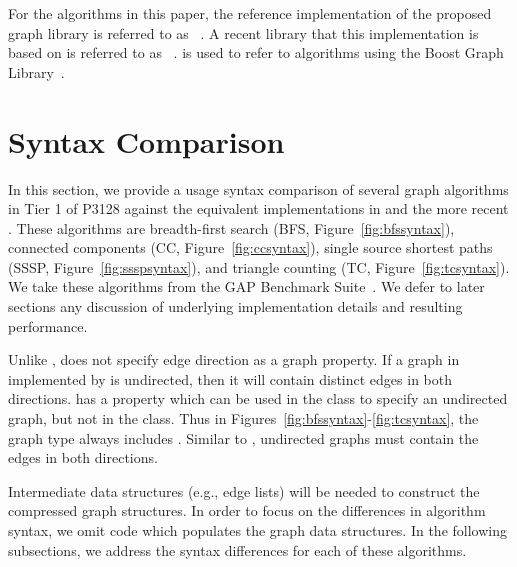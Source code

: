 \clearpage

For the algorithms in this paper, the reference implementation of the proposed graph library is referred to as \stdgraph~\cite{REF_stdgraph_library}. A recent library that this implementation is based on is referred to as \nwgraph~\cite{REF_nwgraph_paper,REF_nwgraph_library}.  \bgl is used to refer to algorithms using the Boost Graph Library~\cite{BGL}.  



\section{Syntax Comparison} \label{syntax}
In this section, we provide a usage syntax comparison of several 
graph algorithms in Tier 1 of P3128 against the equivalent implementations in 
\bgl and the more recent \nwgraph.
These algorithms are breadth-first search (BFS, Figure~\ref{fig:bfssyntax}),
connected components (CC, Figure~\ref{fig:ccsyntax}),
single source shortest paths (SSSP, Figure~\ref{fig:ssspsyntax}),
and triangle counting (TC, Figure~\ref{fig:tcsyntax}).
We take these algorithms from the GAP Benchmark Suite~\cite{beamer2015gap}.
We defer to later sections any discussion of
underlying implementation details and resulting performance.

Unlike \bgl, \stdgraph does not specify edge direction as a graph property.
If a graph in \stdgraph implemented by 
is undirected, then it will contain distinct edges in both directions.
\bgl has a  property
which can be used in the  class
to specify an undirected graph, but
not in the  class.
Thus in Figures~\ref{fig:bfssyntax}-\ref{fig:tcsyntax}, the \bgl graph type 
always includes .
Similar to \stdgraph, undirected graphs must contain the edges in both directions.

Intermediate data structures (e.g., edge lists) will be needed
to construct the compressed graph structures.
In order to focus on the differences in algorithm syntax, we omit
code which populates the graph data structures.
In the following subsections, we address the syntax differences for each of
these algorithms.

